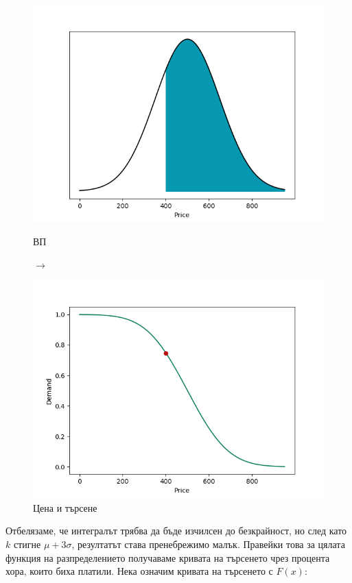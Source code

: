 \documentclass[11pt, a4paper]{article}
\theoremstyle{definition}
\begin{document}
				\begin{figure}[H]
					\begin{minipage}{0.48\textwidth}
						\centering
						\includegraphics[width=\linewidth]{ND_integral}
						\caption{ВП}\label{Fig:Data1}
					\end{minipage}$\longrightarrow$
					\begin{minipage}{0.48\textwidth}
						\centering
						\includegraphics[width=\linewidth]{Sample_point}
						\caption{Цена и търсене}\label{Fig:Data2}
					\end{minipage}
				\end{figure}\par\noindent
				Отбелязаме, че интегралът трябва да бъде изчилсен до безкрайност, но след като $k$ стигне $\mu+3\sigma$, резултатът става пренебрежимо малък. Правейки това за цялата функция на разпределението получаваме кривата на търсенето чрез процента хора, които биха платили. Нека означим кривата на търсенето с $F(x)$:
\end{document}
